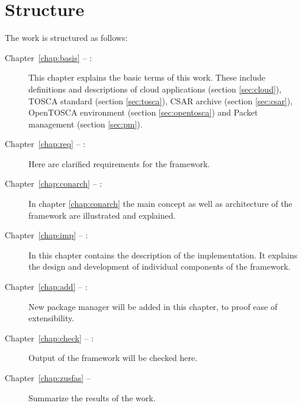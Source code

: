\section*{Structure}
The work is structured as follows:
\begin{description}
\item[Chapter~\ref{chap:basis} -- :] This chapter explains the basic terms of this work. These include definitions and descriptions of cloud applications (section \ref{sec:cloud}), TOSCA standard (section \ref{sec:tosca}), CSAR archive (section \ref{sec:csar}), OpenTOSCA environment  (section \ref{sec:opentosca}) and Packet management (section \ref{sec:pm}).
\item[Chapter~\ref{chap:req} -- :] Here are clarified requirements for the framework.
\item[Chapter~\ref{chap:conarch} -- :] In chapter \ref{chap:conarch} the main concept as well as architecture of the framework are illustrated and explained.
\item[Chapter~\ref{chap:imp} -- :] In this chapter contains the description of the implementation. It explains the design and development of individual components of the framework. 
\item[Chapter~\ref{chap:add} -- :] New package manager will be added in this chapter, to proof ease of extensibility. 
\item[Chapter~\ref{chap:check} -- :] Output of the framework will be checked here.
\item[Chapter~\ref{chap:zusfas} -- ] Summarize the results of the work.
\end{description}
